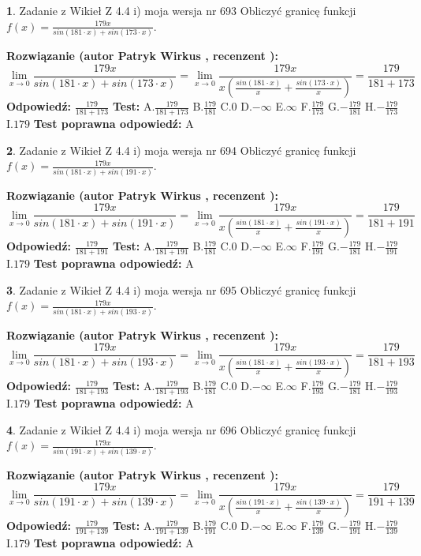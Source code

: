 \documentclass[12pt, a4paper]{article}
\theoremstyle{definition} %
\newtheorem{zad}{}
\newcommand{\zadStart}[1]{\begin{zad}#1\newline}
\newcommand{\zadStop}{\end{zad}}
\newcommand{\rozwStart}[2]{\noindent \textbf{Rozwiązanie (autor #1 , recenzent #2): }\newline}
\newcommand{\rozwStop}{\newline}
\newcommand{\odpStart}{\noindent \textbf{Odpowiedź:}\newline}
\newcommand{\odpStop}{\newline}
\newcommand{\testStart}{\noindent \textbf{Test:}\newline}
\newcommand{\testStop}{\newline}
\newcommand{\kluczStart}{\noindent \textbf{Test poprawna odpowiedź:}\newline}
\newcommand{\kluczStop}{\newline}
\begin{document}
\zadStart{Zadanie z Wikieł Z 4.4 i) moja wersja nr 693}
Obliczyć granicę funkcji $f(x)=\frac{179x}{sin(181\cdot x) +sin(173\cdot x)}$.
\zadStop
\rozwStart{Patryk Wirkus}{}
$$\lim\limits_{x\to 0}\frac{179x}{sin(181\cdot x) +sin(173\cdot x)}=\lim\limits_{x\to 0}\frac{179x}{x(\frac{sin(181\cdot x)}{x}+\frac{sin(173\cdot x)}{x})}=\frac{179}{181+173}$$
\rozwStop
\odpStart
$\frac{179}{181+173}$
\odpStop
\testStart
A.$\frac{179}{181+173}$
B.$\frac{179}{181}$
C.$0$
D.$-\infty$
E.$\infty$
F.$\frac{179}{173}$
G.$-\frac{179}{181}$
H.$-\frac{179}{173}$
I.$179$
\testStop
\kluczStart
A
\kluczStop



\zadStart{Zadanie z Wikieł Z 4.4 i) moja wersja nr 694}
Obliczyć granicę funkcji $f(x)=\frac{179x}{sin(181\cdot x) +sin(191\cdot x)}$.
\zadStop
\rozwStart{Patryk Wirkus}{}
$$\lim\limits_{x\to 0}\frac{179x}{sin(181\cdot x) +sin(191\cdot x)}=\lim\limits_{x\to 0}\frac{179x}{x(\frac{sin(181\cdot x)}{x}+\frac{sin(191\cdot x)}{x})}=\frac{179}{181+191}$$
\rozwStop
\odpStart
$\frac{179}{181+191}$
\odpStop
\testStart
A.$\frac{179}{181+191}$
B.$\frac{179}{181}$
C.$0$
D.$-\infty$
E.$\infty$
F.$\frac{179}{191}$
G.$-\frac{179}{181}$
H.$-\frac{179}{191}$
I.$179$
\testStop
\kluczStart
A
\kluczStop



\zadStart{Zadanie z Wikieł Z 4.4 i) moja wersja nr 695}
Obliczyć granicę funkcji $f(x)=\frac{179x}{sin(181\cdot x) +sin(193\cdot x)}$.
\zadStop
\rozwStart{Patryk Wirkus}{}
$$\lim\limits_{x\to 0}\frac{179x}{sin(181\cdot x) +sin(193\cdot x)}=\lim\limits_{x\to 0}\frac{179x}{x(\frac{sin(181\cdot x)}{x}+\frac{sin(193\cdot x)}{x})}=\frac{179}{181+193}$$
\rozwStop
\odpStart
$\frac{179}{181+193}$
\odpStop
\testStart
A.$\frac{179}{181+193}$
B.$\frac{179}{181}$
C.$0$
D.$-\infty$
E.$\infty$
F.$\frac{179}{193}$
G.$-\frac{179}{181}$
H.$-\frac{179}{193}$
I.$179$
\testStop
\kluczStart
A
\kluczStop



\zadStart{Zadanie z Wikieł Z 4.4 i) moja wersja nr 696}
Obliczyć granicę funkcji $f(x)=\frac{179x}{sin(191\cdot x) +sin(139\cdot x)}$.
\zadStop
\rozwStart{Patryk Wirkus}{}
$$\lim\limits_{x\to 0}\frac{179x}{sin(191\cdot x) +sin(139\cdot x)}=\lim\limits_{x\to 0}\frac{179x}{x(\frac{sin(191\cdot x)}{x}+\frac{sin(139\cdot x)}{x})}=\frac{179}{191+139}$$
\rozwStop
\odpStart
$\frac{179}{191+139}$
\odpStop
\testStart
A.$\frac{179}{191+139}$
B.$\frac{179}{191}$
C.$0$
D.$-\infty$
E.$\infty$
F.$\frac{179}{139}$
G.$-\frac{179}{191}$
H.$-\frac{179}{139}$
I.$179$
\testStop
\kluczStart
A
\kluczStop
\end{document}
